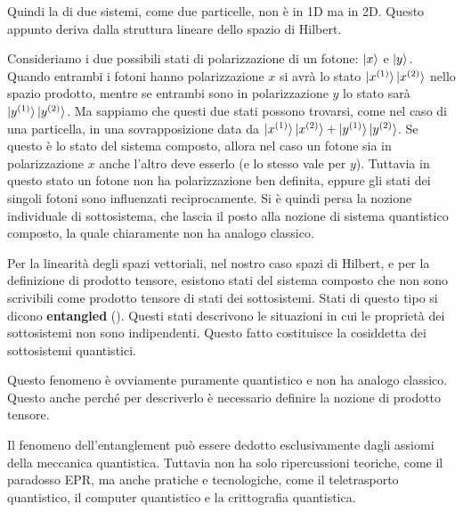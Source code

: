 \documentclass[../../FisicaTeorica.tex]{subfiles}
\begin{document}
Quindi la  di due sistemi, come due particelle, non è in 1D ma in 2D. Questo appunto deriva dalla struttura lineare dello spazio di Hilbert.

\begin{es}
Consideriamo i due possibili stati di polarizzazione di un fotone: $\ket{x}$ e $\ket{y}$. Quando entrambi i fotoni hanno polarizzazione $x$ si avrà lo stato $\ket{x^{(1)}}\ket{x^{(2)}}$ nello spazio prodotto, mentre se entrambi sono in polarizzazione $y$ lo stato sarà $\ket{y^{(1)}}\ket{y^{(2)}}$. Ma sappiamo che questi due stati possono trovarsi, come nel caso di una particella, in una sovrapposizione data da $\ket{x^{(1)}}\ket{x^{(2)}} + \ket{y^{(1)}}\ket{y^{(2)}}$. Se questo è lo stato del sistema composto, allora nel caso un fotone sia in polarizzazione $x$ anche l'altro deve esserlo (e lo stesso vale per $y$). Tuttavia in questo stato un fotone non ha polarizzazione ben definita, eppure gli stati dei singoli fotoni sono influenzati reciprocamente. Si è quindi persa la nozione individuale di sottosistema, che lascia il posto alla nozione di sistema quantistico composto, la quale chiaramente non ha analogo classico.
\end{es}

\begin{oss}
Per la linearità degli spazi vettoriali, nel nostro caso spazi di Hilbert, e per la definizione di prodotto tensore, esistono stati del sistema composto che non sono scrivibili come prodotto tensore di stati dei sottosistemi. Stati di questo tipo si dicono \textbf{entangled} (). Questi stati descrivono le situazioni in cui le proprietà dei sottosistemi non sono indipendenti. Questo fatto costituisce la cosiddetta  dei sottosistemi quantistici.

Questo fenomeno è ovviamente puramente quantistico e non ha analogo classico. Questo anche perché per descriverlo è necessario definire la nozione di prodotto tensore.

Il fenomeno dell'entanglement può essere dedotto esclusivamente dagli assiomi della meccanica quantistica. Tuttavia non ha solo ripercussioni teoriche, come il paradosso EPR, ma anche pratiche e tecnologiche, come il teletrasporto quantistico, il computer quantistico e la crittografia quantistica.
\end{oss}
\end{document}
